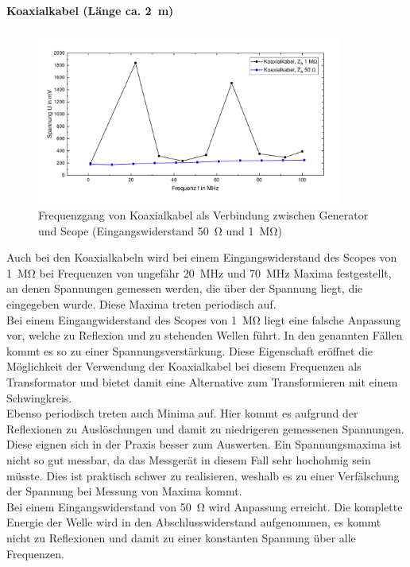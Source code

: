 \documentclass[a4paper,twoside,final]{article}
\begin{document}
\paragraph{Koaxialkabel (Länge ca. \SI{2}{\meter})}

\begin{figure}[htp]
    \centering
        \includegraphics[width=0.9\textwidth]{Bilder/Koaxialkabel_50_1MOhm.pdf}
    \caption{Frequenzgang von Koaxialkabel als Verbindung zwischen Generator und Scope (Eingangswiderstand \SI{50}{\ohm} und \SI{1}{\mega\ohm}) }
\end{figure}

Auch bei den Koaxialkabeln wird bei einem Eingangswiderstand des Scopes von \SI{1}{\mega\ohm} bei Frequenzen von ungefähr \SI{20}{\mega\hertz} und \SI{70}{\mega\hertz} Maxima festgestellt, an denen Spannungen gemessen werden, die über der Spannung liegt, die eingegeben wurde. Diese Maxima treten periodisch auf.\\
Bei einem Eingangwiderstand des Scopes von \SI{1}{\mega\ohm} liegt eine falsche Anpassung vor, welche zu Reflexion und zu stehenden Wellen führt. In den genannten Fällen kommt es so zu einer Spannungsverstärkung. Diese Eigenschaft eröffnet die Möglichkeit der Verwendung der Koaxialkabel bei diesem Frequenzen als Transformator und bietet damit eine Alternative zum Transformieren mit einem Schwingkreis.\\
Ebenso periodisch treten auch Minima auf. Hier kommt es aufgrund der Reflexionen zu Auslöschungen und damit zu niedrigeren gemessenen Spannungen. Diese eignen sich in der Praxis besser zum Auswerten. Ein Spannungsmaxima ist nicht so gut messbar, da das Messgerät in diesem Fall sehr hochohmig sein müsste. Dies ist praktisch schwer zu realisieren, weshalb es zu einer Verfälschung der Spannung bei Messung von Maxima kommt.\\
Bei einem Eingangswiderstand von \SI{50}{\ohm} wird Anpassung erreicht. Die komplette Energie der Welle wird in den Abschlusswiderstand aufgenommen, es kommt nicht zu Reflexionen und damit zu einer konstanten Spannung über alle Frequenzen. \\
\end{document}
